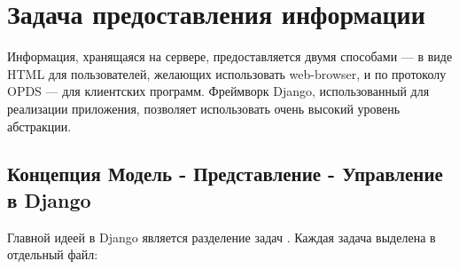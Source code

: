 \section{ Задача предоставления информации}

Информация, хранящаяся на сервере, предоставляется двумя способами --- в виде HTML для пользователей, желающих использовать web-browser, и по протоколу OPDS --- для клиентских программ. Фреймворк Django, использованный для реализации приложения, позволяет использовать очень высокий уровень абстракции.

\subsection{Концепция Модель - Представление - Управление в Django}

Главной идеей в Django является разделение задач \cite{mvc-djangobook}. Каждая задача выделена в отдельный файл:

